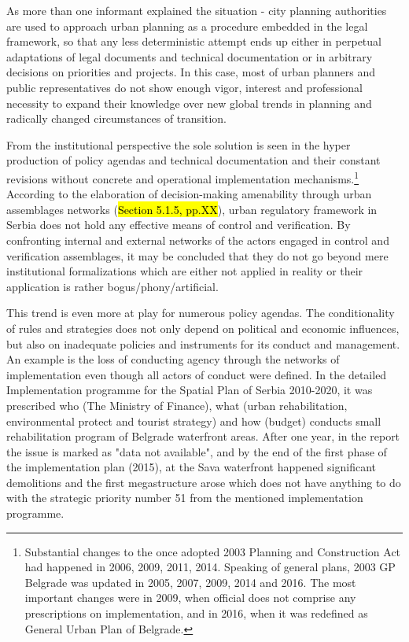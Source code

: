 \documentclass[11pt]{report}
\begin{document}
As more than one informant explained the situation - city planning authorities are used to approach urban planning as a procedure embedded in the legal framework, so that any less deterministic attempt ends up either in perpetual adaptations of legal documents and technical documentation or in arbitrary decisions on priorities and projects.
In this case, most of urban planners and public representatives do not show enough vigor, interest and professional necessity to expand their knowledge over new global trends in planning and radically changed circumstances of transition.

From the institutional perspective the sole solution is seen in the hyper production of policy agendas and technical documentation and their constant revisions without concrete and operational implementation mechanisms.\footnote{
Substantial changes to the once adopted 2003 Planning and Construction Act had happened in 2006, 2009, 2011, 2014.
Speaking of general plans, 2003 GP Belgrade was updated in 2005, 2007, 2009, 2014 and 2016.
The most important changes were in 2009, when official does not comprise any prescriptions on implementation, and in 2016, when it was redefined as General Urban Plan of Belgrade.}
According to the elaboration of decision-making amenability through urban assemblages networks (\hl{Section 5.1.5, pp.XX}), urban regulatory framework in Serbia does not hold any effective means of control and verification.
By confronting internal and external networks of the actors engaged in control and verification assemblages, it may be concluded that they do not go beyond mere institutional formalizations which are either not applied in reality or their application is rather bogus/phony/artificial.

This trend is even more at play for numerous policy agendas.
The conditionality of rules and strategies does not only depend on political and economic influences, but also on inadequate policies and instruments for its conduct and management.
An example is the loss of conducting agency through the networks of implementation even though all actors of conduct were defined. In the detailed Implementation programme for the Spatial Plan of Serbia 2010-2020, it was prescribed who (The Ministry of Finance), what (urban rehabilitation, environmental protect and tourist strategy) and how (budget) conducts small rehabilitation program of Belgrade waterfront areas.
After one year, in the report the issue is marked as "data not available", and by the end of the first phase of the implementation plan (2015), at the Sava waterfront happened significant demolitions and the first megastructure arose which does not have anything to do with the strategic priority number 51 from the mentioned implementation programme.
\end{document}
